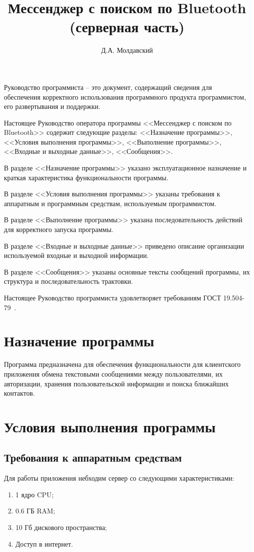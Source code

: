 \documentclass[progmanual]{espd}
\author{Д.А. Молдавский}
\title{Мессенджер с поиском по Bluetooth\\(серверная часть)}
\begin{document}
\annotation

Руководство программиста -- это документ, содержащий сведения для обеспечения корректного использования программного продукта программистом, его развертывания и поддержки.

Настоящее Руководство оператора программы <<Мессенджер с поиском по Bluetooth>>  содержит следующие разделы: <<Назначение программы>>, <<Условия выполнения программы>>, <<Выполнение программы>>, <<Входные и выходные данные>>, <<Сообщения>>.

В разделе <<Назначение программы>> указано эксплуатационное назначение и краткая характеристика функциональности программы.

В разделе <<Условия выполнения программы>> указаны требования к аппаратным и программным средствам, используемым программистом.

В разделе <<Выполнение программы>> указана последовательность действий для корректного запуска программы.

В разделе <<Входные и выходные данные>> приведено описание организации используемой входные и выходной информации.

В разделе <<Сообщения>> указаны основные тексты сообщений программы, их структура и последовательность трактовки.

Настоящее Руководство программиста удовлетворяет требованиям ГОСТ 19.504-79~\cite{espd504}.

\tableofcontents

\section{Назначение программы}
Программа предназначена для обеспечения функциональности для клиентского приложения обмена текстовыми сообщениями между пользователями, их авторизации, хранения пользовательской информации и поиска ближайших контактов.

\section{Условия выполнения программы}
\subsection{Требования к аппаратным средствам}
Для работы приложения небходим сервер со следующими характеристиками:
\begin{enumerate}
\item 1 ядро CPU;
\item 0.6 ГБ RAM;
\item 10 Гб дискового пространства;
\item Доступ в интернет.
\end{enumerate}
\end{document}
